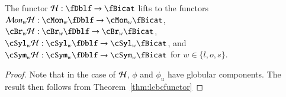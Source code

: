 \begin{thm}\label{thm:H}
The functor $\cH: \fDblf \rightarrow \fBicat$ lifts to the functors $\cM on_w \cH: \cMon_w\fDblf \rightarrow \cMon_w \fBicat$, $\cBr_w \cH: \cBr_w\fDblf \rightarrow \cBr_w \fBicat$,  $\cSyl_w\cH: \cSyl_w\fDblf \rightarrow \cSyl_w\fBicat$, and $\cSym_w \cH: \cSym_w\fDblf \rightarrow \cSym_w \fBicat$ for $w\in \{l,o,s\}$.
\end{thm}

\begin{proof}
Note that in the case of $\mathcal{H}$, $\phi$ and $\phi_u$ have globular components. The result then follows from Theorem~\ref{thm:lcbcfunctor}
\end{proof}



